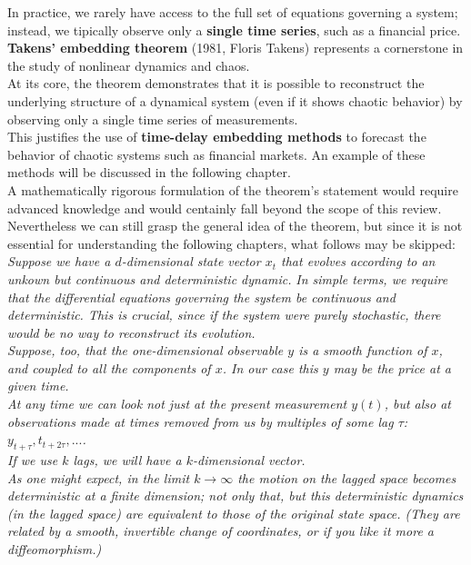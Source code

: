 In practice, we rarely have access to the full set of equations governing a system; instead, we tipically observe only a \textbf{single time series}, such as a financial price.\\

\textbf{Takens' embedding theorem} (1981, Floris Takens) represents a cornerstone in the study of nonlinear dynamics and chaos.\\

At its core, the theorem demonstrates that it is possible to reconstruct the underlying structure of a dynamical system (even if it shows chaotic behavior) by observing only a single time series of measurements.\\

This justifies the use of \textbf{time-delay embedding methods} to forecast the behavior of chaotic systems such as financial markets. An example of these methods will be discussed in the following chapter.\\

A mathematically rigorous formulation of the theorem's statement would require advanced knowledge and would centainly fall beyond the scope of this review.\\

Nevertheless we can still grasp the general idea of the theorem, but since it is not essential for understanding the following chapters, what follows may be skipped:\\

\textit{Suppose we have a $d$-dimensional state vector $x_t$ that evolves according to an unkown but continuous and deterministic dynamic.} \textit{In simple terms, we require that the differential equations governing the system be continuous and deterministic. This is crucial, since if the system were purely stochastic, there would be no way to reconstruct its evolution.}\\
\textit{Suppose, too, that the one-dimensional observable $y$ is a smooth function of $x$, and coupled to all the components of $x$. In our case this $y$ may be the price at a given time.}\\

\textit{At any time we can look not just at the present measurement $y(t)$, but also at observations made at times removed from us by multiples of some lag $\tau$: $y_{t+\tau},t_{t+2\tau},...$.\\}
\textit{If we use $k$ lags, we will have a $k$-dimensional vector.\\}
\textit{As one might expect, in the limit $k \to \infty$ the motion on the lagged space becomes deterministic at a finite dimension; not only that, but this deterministic dynamics (in the lagged space) are equivalent to those of the original state space. (They are related by a smooth, invertible change of coordinates, or if you like it more a diffeomorphism.)}



